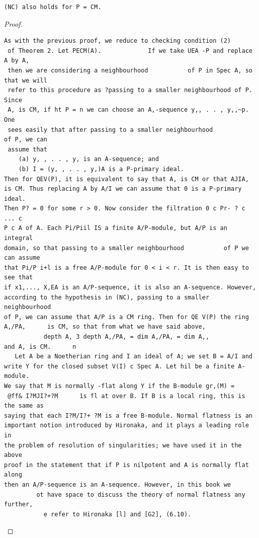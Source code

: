 \begin{theorem}\label{mcrt-auto-theorem-24-5}\uses{}
\begin{verbatim}
(NC) also holds for P = CM.
\end{verbatim}
\end{theorem}
\begin{proof}
\begin{verbatim}
As with the previous proof, we reduce to checking condition (2)
 of Theorem 2. Let PECM(A).             If we take UEA -P and replace A by A,
 then we are considering a neighbourhood           of P in Spec A, so that we will
 refer to this procedure as ?passing to a smaller neighbourhood of P. Since
 A, is CM, if ht P = n we can choose an A,-sequence y,, . . , y,,~p. One
 sees easily that after passing to a smaller neighbourhood           of P, we can
 assume that
    (a) y, , . . , y, is an A-sequence; and
    (b) I = (y, , . . , y,)A is a P-primary ideal.
Then for QEV(P), it is equivalent to say that A, is CM or that AJIA,
is CM. Thus replacing A by A/I we can assume that 0 is a P-primary ideal.
Then P? = 0 for some r > 0. Now consider the filtration 0 c Pr- ? c ... c
P c A of A. Each Pi/Piil IS a finite A/P-module, but A/P is an integral
domain, so that passing to a smaller neighbourhood           of P we can assume
that Pi/P i+l is a free A/P-module for 0 < i < r. It is then easy to see that
if x1,..., X,EA is an A/P-sequence, it is also an A-sequence. However,
according to the hypothesis in (NC), passing to a smaller neighbourhood
of P, we can assume that A/P is a CM ring. Then for QE V(P) the ring
A,/PA,      is CM, so that from what we have said above,
           depth A, 3 depth A,/PA, = dim A,/PA, = dim A,,
and A, is CM.      n
   Let A be a Noetherian ring and I an ideal of A; we set B = A/I and
write Y for the closed subset V(I) c Spec A. Let hil be a finite A-module.
We say that M is normally -flat along Y if the B-module gr,(M) =
 @ff& I?MJI?+?M      1s fl at over B. If B is a local ring, this is the same as
saying that each I?M/I?+ ?M is a free B-module. Normal flatness is an
important notion introduced by Hironaka, and it plays a leading role in
the problem of resolution of singularities; we have used it in the above
proof in the statement that if P is nilpotent and A is normally flat along
then an A/P-sequence is an A-sequence. However, in this book we
         ot have space to discuss the theory of normal flatness any further,
           e refer to Hironaka [l] and [G2], (6.10).
\end{verbatim}
\end{proof}


